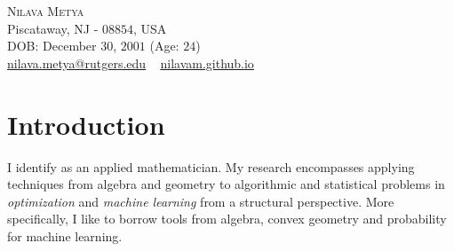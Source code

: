 
\usepackage{tabto}
\usepackage{setspace}
\usepackage{etaremune}
\usepackage{xcolor}
\usepackage[symbol]{footmisc}
\newcommand*\circled[1]{\tikz[baseline=(char.base)]{
            \node[shape=circle,draw,inner sep=1pt, line width=1.1pt] (char) {#1};}}





\begin{center}
    {\Huge \scshape Nilava Metya} \\ \vspace{1pt}
    Piscataway, NJ - $08854$, USA\\
    DOB: December $30$, $2001$ (Age: $24$)\\ \vspace{1pt}
{\small 
\href{mailto:nilava.metya@rutgers.edu}{\circled{\scriptsize\faEnvelope}  \underline{nilava.metya@rutgers.edu}} ~ 
{\circled{\scriptsize\faHome} \underline{\url{nilavam.github.io}}}}
\end{center}




\section{Introduction}
I identify as an applied mathematician. My research encompasses applying techniques from algebra and geometry to algorithmic and statistical problems in \textit{optimization} and \textit{machine learning} from a structural perspective. More specifically, I like to borrow tools from algebra, convex geometry and probability for machine learning.
\vspace{\gap}
